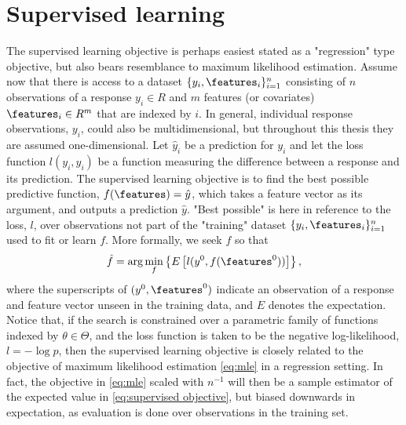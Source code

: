 \section{Supervised learning}

The supervised learning objective is perhaps easiest stated as a "regression" type objective, but also bears resemblance to maximum likelihood estimation.
Assume now that there is access to a dataset
$\{y_i,\features_i\}_{i=1}^n$
consisting of $n$ observations of a response $y_i\in R$ and $m$ features (or covariates) $\features_i\in R^{m}$ that are indexed by $i$.
In general, individual response observations, $y_i$, could also be multidimensional, but throughout this thesis they are assumed one-dimensional.
Let $\hat{y}_i$ be a prediction for $y_i$ and let the loss function $l(y_i,\hat{y}_i)$ be a function measuring the difference between a response and its prediction.
The supervised learning objective is to find the best possible predictive function, $f(\features)=\hat{y}$, which takes a feature vector as its argument, and outputs a prediction $\hat{y}$. "Best possible" is here in reference to the loss, $l$, over observations not part of the "training" dataset $\{y_i,\features_i\}_{i=1}^n$ used to fit or learn $f$.
More formally, we seek $f$ so that
\begin{align}\label{eq:supervised objective}
	\hat{f} = \arg\min_f \left\{ E\left[l(y^0, f(\features^0))\right] \right\},
\end{align} 
where the superscripts of $(y^0, \features^0)$ indicate an observation of a response and feature vector unseen in the training data, and $E$ denotes the expectation.
Notice that, if the search is constrained over a parametric family of functions indexed by $\theta\in\Theta$, and the loss function is taken to be the negative log-likelihood, $l=-\log p$, then the supervised learning objective is closely related to the objective of maximum likelihood estimation \eqref{eq:mle} in a regression setting.
In fact, the objective in \eqref{eq:mle} scaled with $n^{-1}$ will then be a sample estimator of the expected value in \eqref{eq:supervised objective}, but biased downwards in expectation, as evaluation is done over observations in the training set.
